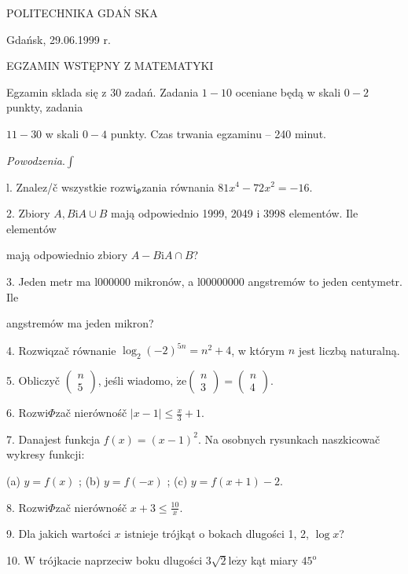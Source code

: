 \documentclass[a4paper,12pt]{article}
\begin{document}
POLITECHNIKA $\mathrm{G}\mathrm{D}\mathrm{A}\acute{\mathrm{N}}$ SKA

Gdańsk, 29.06.1999 r.

EGZAMIN WSTĘPNY Z MATEMATYKI

Egzamin sklada się z 30 zadań. Zadania $1-10$ oceniane będą w skali $0-2$ punkty, zadania

$11-30$ w skali $0-4$ punkty. Czas trwania egzaminu -- 240 minut.

{\it Powodzenia}.$\displaystyle \int$

l. Znalez/č wszystkie $\mathrm{r}\mathrm{o}\mathrm{z}\mathrm{w}\mathrm{i}_{\Phi}$zania równania $81x^{4}-72x^{2}=-16.$

2. Zbiory $A, B\mathrm{i}A\cup B$ mają odpowiednio 1999, 2049 $\mathrm{i}$ 3998 elementów. Ile elementów

mają odpowiednio zbiory $A-B\mathrm{i}A\cap B$?

3. Jeden metr ma l000000 mikronów, a l00000000 angstremów to jeden centymetr. Ile

angstremów ma jeden mikron?

4. Rozwiqzač równanie $\log_{2}(-2)^{5n}=n^{2}+4$, w którym $n$ jest liczbą naturalną.

5. Obliczyč $\left(\begin{array}{l}
n\\
5
\end{array}\right)$, jeśli wiadomo, $\dot{\mathrm{z}}\mathrm{e} \left(\begin{array}{l}
n\\
3
\end{array}\right) =\left(\begin{array}{l}
n\\
4
\end{array}\right)$.

6. Rozwi$\Phi$zač nierównośč $|x-1|\displaystyle \leq\frac{x}{3}+1.$

7. Danajest funkcja $f(x)=(x-1)^{2}$. Na osobnych rysunkach naszkicowač wykresy funkcji:

(a) $y=f(x)$ ; (b) $y=f(-x)$ ; (c) $y=f(x+1)-2.$

8. Rozwi$\Phi$zač nierównośč $x+3\displaystyle \leq\frac{10}{x}.$

9. Dla jakich wartości $x$ istnieje trójkąt o bokach dlugości 1, 2, $\log x$?

10. $\mathrm{W}$ trójkacie naprzeciw boku dlugości $3\sqrt{2}\mathrm{l}\mathrm{e}\dot{\mathrm{z}}\mathrm{y}$ kąt miary $45^{\mathrm{o}}$
\end{document}

